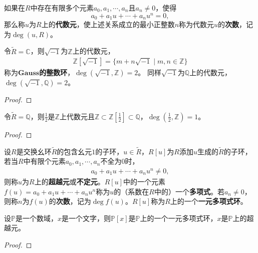 \documentclass[../../main.tex]{subfiles}%
\begin{document}
\begin{definition}\label{definecolor:抽象代数--代数元的定义}
如果在\( R \)中存在有限多个元素\( a_0, a_1, \cdots, a_n \)且\( a_n \neq 0 \)，使得
\[
a_0 + a_1 u + \cdots + a_n u^n = 0,
\]
那么称\( u \)为\( R \)上的\textbf{代数元}，使上述关系成立的最小正整数\( n \)称为代数元\( u \)的\textbf{次数}，记为\( \deg(u, R) \)。
\end{definition}

\begin{example}
令$\widetilde{R}=\mathbb{C}$，则$\sqrt{-1}$为$\mathbb{Z}$上的代数元，
\begin{align*}
\mathbb{Z}[\sqrt{-1}]=\{m+n\sqrt{-1}\mid m,n\in\mathbb{Z}\}
\end{align*}
称为$\mathbf{Gauss}$\textbf{的整数环}，$\deg(\sqrt{-1},\mathbb{Z})=2$。
同样$\sqrt{-1}$为$\mathbb{Q}$上的代数元，$\deg(\sqrt{-1},\mathbb{Q})=2$。
\end{example}
\begin{proof}



\end{proof}

\begin{example}
令$\widetilde{R}=\mathbb{Q}$，则$\frac{1}{2}$是$\mathbb{Z}$上代数元且$\mathbb{Z}\subset\mathbb{Z}\left[\frac{1}{2}\right]\subset\mathbb{Q}$，$\deg\left(\frac{1}{2},\mathbb{Z}\right)=1$。
\end{example}
\begin{proof}



\end{proof}

\begin{definition}
设$R$是交换幺环$\widetilde{R}$的包含幺元$1$的子环，\( u \in \widetilde{R} \)，$R[u]$为$R$添加$u$生成的$\widetilde{R}$的子环，若当$R$中有限个元素$a_0,a_1,\cdots,a_n$不全为0时，
\begin{align*}
a_0+a_1u+\cdots+a_nu^n\neq 0,
\end{align*}
则称$u$为$R$上的\textbf{超越元}或\textbf{不定元}。$R[u]$中的一个元素$f(u)=a_0+a_1u+\cdots+a_nu^n$称为$u$的（系数在$R$中的）一个\textbf{多项式}。若$a_n\neq 0$，则称$n$为$f(u)$的\textbf{次数}，记为$\deg f(u)$。$R[u]$称为$R$上的一个\textbf{一元多项式环}。
\end{definition}

\begin{example}
设$\mathbb{P}$是一个数域，$x$是一个文字，则$\mathbb{P}[x]$是$\mathbb{P}$上的一个一元多项式环，$x$是$\mathbb{P}$上的超越元。
\end{example}
\begin{proof}



\end{proof}
\end{document}

